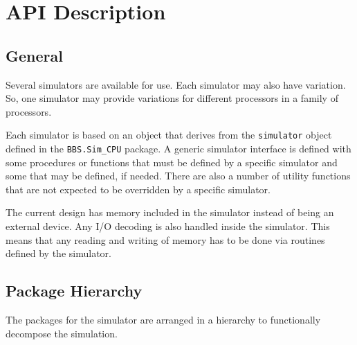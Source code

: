 \documentclass[10pt, openany]{book}
\newcommand{\package}[1]{\texttt{#1}}
\newcommand{\datatype}[1]{\texttt{#1}}
\begin{document}
\chapter{API Description}
\label{chap:API}
\section{General}
Several simulators are available for use.
Each simulator may also have variation.
So, one simulator may provide variations for different processors in a family of processors.

Each simulator is based on an object that derives from the \datatype{simulator} object defined in the \package{BBS.Sim\_CPU} package.
A generic simulator interface is defined with some procedures or functions that must be defined by a specific simulator and some that may be defined, if needed.
There are also a number of utility functions that are not expected to be overridden by a specific simulator.

The current design has memory included in the simulator instead of being an external device.
Any I/O decoding is also handled inside the simulator.
This means that any reading and writing of memory has to be done via routines defined by the simulator.

\section{Package Hierarchy}
The packages for the simulator are arranged in a hierarchy to functionally decompose the simulation.
\end{document}

